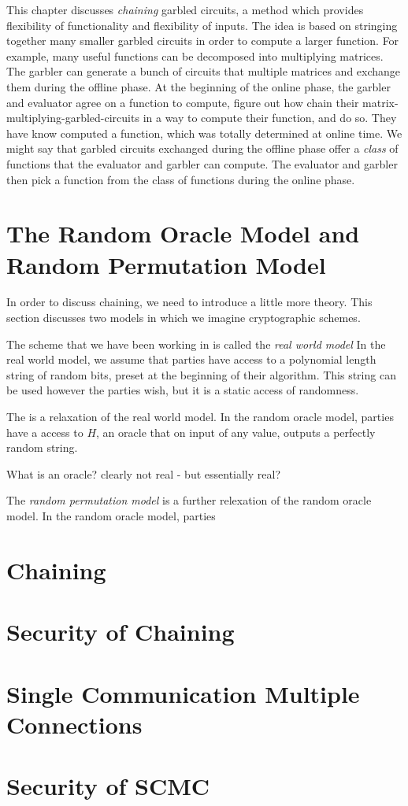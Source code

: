 This chapter discusses \textit{chaining} garbled circuits, a method which provides flexibility of functionality and flexibility of inputs.
The idea is based on stringing together many smaller garbled circuits in order to compute a larger function.
For example, many useful functions can be decomposed into multiplying matrices.
The garbler can generate a bunch of circuits that multiple matrices and exchange them during the offline phase.
At the beginning of the online phase, the garbler and evaluator agree on a function to compute, figure out how chain their matrix-multiplying-garbled-circuits in a way to compute their function, and do so.
They have know computed a function, which was totally determined at online time.
We might say that garbled circuits exchanged during the offline phase offer a \textit{class} of functions that the evaluator and garbler can compute.
The evaluator and garbler then pick a function from the class of functions during the online phase.

\section{The Random Oracle Model and Random Permutation Model}
In order to discuss chaining, we need to introduce a little more theory.
This section discusses two models in which we imagine cryptographic schemes.

The scheme that we have been working in is called the \textit{real world model} 
In the real world model, we assume that parties have access to a polynomial length string of random bits, preset at the beginning of their algorithm.
This string can be used however the parties wish, but it is a static access of randomness.

The  is a relaxation of the real world model.
In the random oracle model, parties have a access to $H$, an oracle that on input of any value, outputs a perfectly random string. 

What is an oracle?
clearly not real - but essentially real?

The \textit{random permutation model} is a further relexation of the random oracle model.
In the random oracle model, parties

\section{Chaining}
\section{Security of Chaining}
\section{Single Communication Multiple Connections}
\section{Security of SCMC}
